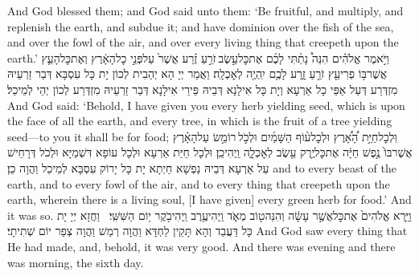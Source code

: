 {And God blessed them; and God said unto them: ‘Be fruitful, and multiply, and replenish the earth, and subdue it; and have dominion over the fish of the sea, and over the fowl of the air, and over every living thing that creepeth upon the earth.’}{}
{וַיֹּ֣אמֶר אֱלֹהִ֗ים הִנֵּה֩ נָתַ֨תִּי לָכֶ֜ם אֶת\maqqaf כׇּל\maqqaf עֵ֣שֶׂב \legarmeh  זֹרֵ֣עַ זֶ֗רַע אֲשֶׁר֙ עַל\maqqaf פְּנֵ֣י כׇל\maqqaf הָאָ֔רֶץ וְאֶת\maqqaf כׇּל\maqqaf הָעֵ֛ץ אֲשֶׁר\maqqaf בּ֥וֹ פְרִי\maqqaf עֵ֖ץ זֹרֵ֣עַ זָ֑רַע לָכֶ֥ם יִֽהְיֶ֖ה לְאׇכְלָֽה׃}
{וַאֲמַר יְיָ הָא יְהַבִית לְכוֹן יָת כָּל עִסְבָּא דְּבַר זַרְעֵיהּ מִזְדְּרַע דְּעַל אַפֵּי כָל אַרְעָא וְיָת כָּל אִילָנָא דְּבֵיהּ פֵּירֵי אִילָנָא דְּבַר זַרְעֵיהּ מִזְדְּרַע לְכוֹן יְהֵי לְמֵיכַל׃}
{And God said: ‘Behold, I have given you every herb yielding seed, which is upon the face of all the earth, and every tree, in which is the fruit of a tree yielding seed—to you it shall be for food;}{}
{וּֽלְכׇל\maqqaf חַיַּ֣ת הָ֠אָ֠רֶץ וּלְכׇל\maqqaf ע֨וֹף הַשָּׁמַ֜יִם וּלְכֹ֣ל \legarmeh  רוֹמֵ֣שׂ עַל\maqqaf הָאָ֗רֶץ אֲשֶׁר\maqqaf בּוֹ֙ נֶ֣פֶשׁ חַיָּ֔ה אֶת\maqqaf כׇּל\maqqaf יֶ֥רֶק עֵ֖שֶׂב לְאׇכְלָ֑ה וַֽיְהִי\maqqaf כֵֽן׃}
{וּלְכָל חַיַּת אַרְעָא וּלְכָל עוֹפָא דִּשְׁמַיָּא וּלְכֹל דְּרָחֵישׁ עַל אַרְעָא דְּבֵיהּ נַפְשָׁא חַיְתָא יָת כָּל יָרוֹק עִסְבָּא לְמֵיכַל וַהֲוָה כֵן׃}
{and to every beast of the earth, and to every fowl of the air, and to every thing that creepeth upon the earth, wherein there is a living soul, [I have given] every green herb for food.’ And it was so.}{}
{וַיַּ֤רְא אֱלֹהִים֙ אֶת\maqqaf כׇּל\maqqaf אֲשֶׁ֣ר עָשָׂ֔ה וְהִנֵּה\maqqaf ט֖וֹב מְאֹ֑ד וַֽיְהִי\maqqaf עֶ֥רֶב וַֽיְהִי\maqqaf בֹ֖קֶר י֥וֹם הַשִּׁשִּֽׁי׃ \petucha }
{וַחֲזָא יְיָ יָת כָּל דַּעֲבַד וְהָא תָּקֵין לַחְדָּא וַהֲוָה רְמַשׁ וַהֲוָה צְפַר יוֹם שְׁתִיתָי׃}
{And God saw every thing that He had made, and, behold, it was very good. And there was evening and there was morning, the sixth day.}{}
